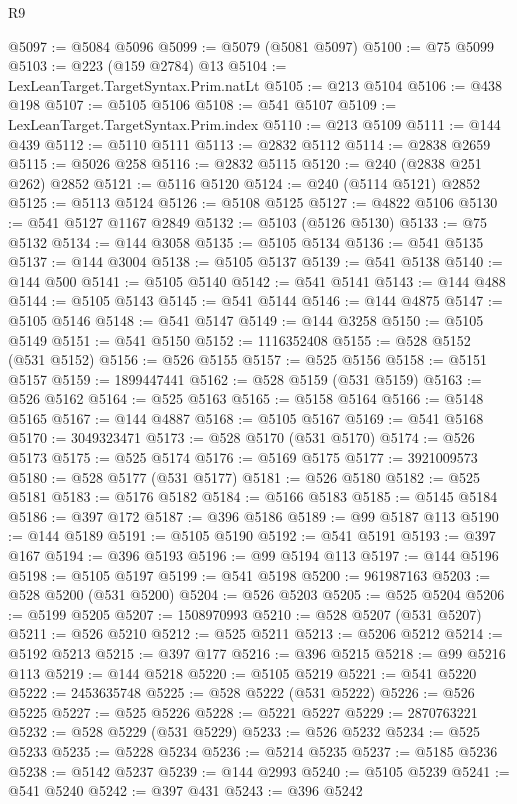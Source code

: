 \begin{lexlean}{R9}
\begin{coremodule}
{{{{{{{{{{{{{{{{{{{{{{{{{{{{{{{{{{{{{{{{{{{{{{{{{{{{{{{{{{{{{{{{{{{{{{{{{{{{{{{{{{{{@5097 := @5084 @5096
@5099 := @5079 (@5081 @5097)
@5100 := @75 @5099
@5103 := @223 (@159 @2784) @13
@5104 := LexLeanTarget.TargetSyntax.Prim.natLt
@5105 := @213 @5104
@5106 := @438 @198
@5107 := @5105 @5106
@5108 := @541 @5107
@5109 := LexLeanTarget.TargetSyntax.Prim.index
@5110 := @213 @5109
@5111 := @144 @439
@5112 := @5110 @5111
@5113 := @2832 @5112
@5114 := @2838 @2659
@5115 := @5026 @258
@5116 := @2832 @5115
@5120 := @240 (@2838 @251 @262) @2852
@5121 := @5116 @5120
@5124 := @240 (@5114 @5121) @2852
@5125 := @5113 @5124
@5126 := @5108 @5125
@5127 := @4822 @5106
@5130 := @541 @5127 @1167 @2849
@5132 := @5103 (@5126 @5130)
@5133 := @75 @5132
@5134 := @144 @3058
@5135 := @5105 @5134
@5136 := @541 @5135
@5137 := @144 @3004
@5138 := @5105 @5137
@5139 := @541 @5138
@5140 := @144 @500
@5141 := @5105 @5140
@5142 := @541 @5141
@5143 := @144 @488
@5144 := @5105 @5143
@5145 := @541 @5144
@5146 := @144 @4875
@5147 := @5105 @5146
@5148 := @541 @5147
@5149 := @144 @3258
@5150 := @5105 @5149
@5151 := @541 @5150
@5152 := 1116352408
@5155 := @528 @5152 (@531 @5152)
@5156 := @526 @5155
@5157 := @525 @5156
@5158 := @5151 @5157
@5159 := 1899447441
@5162 := @528 @5159 (@531 @5159)
@5163 := @526 @5162
@5164 := @525 @5163
@5165 := @5158 @5164
@5166 := @5148 @5165
@5167 := @144 @4887
@5168 := @5105 @5167
@5169 := @541 @5168
@5170 := 3049323471
@5173 := @528 @5170 (@531 @5170)
@5174 := @526 @5173
@5175 := @525 @5174
@5176 := @5169 @5175
@5177 := 3921009573
@5180 := @528 @5177 (@531 @5177)
@5181 := @526 @5180
@5182 := @525 @5181
@5183 := @5176 @5182
@5184 := @5166 @5183
@5185 := @5145 @5184
@5186 := @397 @172
@5187 := @396 @5186
@5189 := @99 @5187 @113
@5190 := @144 @5189
@5191 := @5105 @5190
@5192 := @541 @5191
@5193 := @397 @167
@5194 := @396 @5193
@5196 := @99 @5194 @113
@5197 := @144 @5196
@5198 := @5105 @5197
@5199 := @541 @5198
@5200 := 961987163
@5203 := @528 @5200 (@531 @5200)
@5204 := @526 @5203
@5205 := @525 @5204
@5206 := @5199 @5205
@5207 := 1508970993
@5210 := @528 @5207 (@531 @5207)
@5211 := @526 @5210
@5212 := @525 @5211
@5213 := @5206 @5212
@5214 := @5192 @5213
@5215 := @397 @177
@5216 := @396 @5215
@5218 := @99 @5216 @113
@5219 := @144 @5218
@5220 := @5105 @5219
@5221 := @541 @5220
@5222 := 2453635748
@5225 := @528 @5222 (@531 @5222)
@5226 := @526 @5225
@5227 := @525 @5226
@5228 := @5221 @5227
@5229 := 2870763221
@5232 := @528 @5229 (@531 @5229)
@5233 := @526 @5232
@5234 := @525 @5233
@5235 := @5228 @5234
@5236 := @5214 @5235
@5237 := @5185 @5236
@5238 := @5142 @5237
@5239 := @144 @2993
@5240 := @5105 @5239
@5241 := @541 @5240
@5242 := @397 @431
@5243 := @396 @5242
}}}}}}}}}}}}}}}}}}}}}}}}}}}}}}}}}}}}}}}}}}}}}}}}}}}}}}}}}}}}}}}}}}}}}}}}}}}}}}}}}}}}
\end{coremodule}
\end{lexlean}
